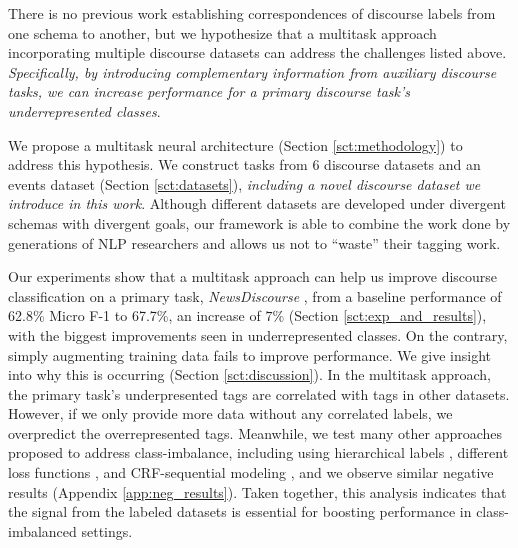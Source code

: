 \documentclass[11pt]{article}
\begin{document}
There is no previous work establishing correspondences of discourse labels from one schema to another, but we hypothesize that a multitask approach incorporating multiple discourse datasets can address the challenges listed above. \textit{Specifically, by introducing complementary information from auxiliary discourse tasks, we can increase performance for a primary discourse task's underrepresented classes}.%

We propose %
a multitask neural architecture (Section \ref{sct:methodology}) to address this hypothesis. %
We construct tasks from 6 discourse datasets and an events dataset (Section \ref{sct:datasets}), \textit{including a novel discourse dataset we introduce in this work}. Although different datasets are developed under divergent schemas with divergent goals, our framework is able to combine the work done by generations of NLP researchers and allows us not to ``waste'' their tagging work. %

Our experiments show that a multitask approach can help us improve discourse classification on a primary task, \textit{NewsDiscourse} \cite{choubey-etal-2020-discourse}, from a baseline performance of 62.8\% Micro F-1 to 67.7\%, an increase of $7\%$ (Section \ref{sct:exp_and_results}), with the biggest improvements seen in underrepresented classes.
On the contrary, simply augmenting training data
fails to improve performance.
We give insight into why this is occurring (Section \ref{sct:discussion}). In the multitask approach, the primary task's underpresented tags are correlated with tags in other datasets. However, if we only provide more data without any correlated labels, we overpredict the overrepresented tags. Meanwhile, we test many other approaches proposed to address class-imbalance, including using hierarchical labels \cite{silva2017improving}, different loss functions \cite{li2019dice}, and CRF-sequential modeling \cite{tomanek2009reducing}, and we observe similar negative results (Appendix \ref{app:neg_results}). Taken together, this analysis indicates that the signal from the labeled datasets is essential for boosting performance in class-imbalanced settings.
\end{document}
